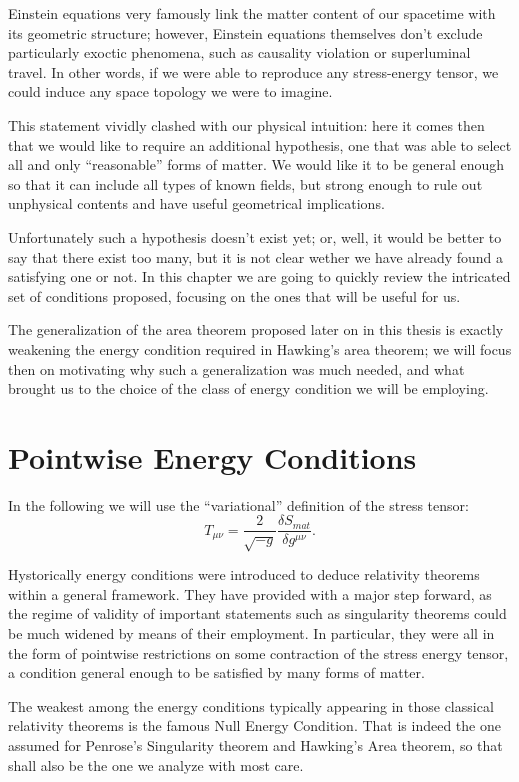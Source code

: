 Einstein equations very famously link the matter content of our spacetime with its geometric structure; however, Einstein equations themselves don't exclude particularly exoctic phenomena, such as causality violation or superluminal travel. In other words, if we were able to reproduce any stress-energy tensor, we could induce any space topology we were to imagine.

This statement vividly clashed with our physical intuition: here it comes then that we would like to require an additional hypothesis, one that was able to select all and only ``reasonable'' forms of matter. We would like it to be general enough so that it can include all types of known fields, but strong enough to rule out unphysical contents and have useful geometrical implications.

Unfortunately such a hypothesis doesn't exist yet; or, well, it would be better to say that there exist too many, but it is not clear wether we have already found a satisfying one or not. In this chapter we are going to quickly review the intricated set of conditions proposed, focusing on the ones that will be useful for us. 

The generalization of the area theorem proposed later on in this thesis is exactly weakening the energy condition required in Hawking's area theorem; we will focus then on motivating why such a generalization was much needed, and what brought us to the choice of the class of energy condition we will be employing.

\section{Pointwise Energy Conditions}

In the following we will use the ``variational'' definition of the stress tensor:
\[
   T_{\mu\nu} = \frac{2}{\sqrt{-g}} \frac{\delta S_{mat}}{\delta g^{\mu\nu}}. 
\]

Hystorically energy conditions were introduced to deduce relativity theorems within a general framework. They have provided with a major step forward, as the regime of validity of important statements such as singularity theorems could be much widened by means of their employment. 
In particular, they were all in the form of pointwise restrictions on some contraction of the stress energy tensor, a condition general enough to be satisfied by many forms of matter.

The weakest among the energy conditions typically appearing in those classical relativity theorems is the famous Null Energy Condition. That is indeed the one assumed for Penrose's Singularity theorem and Hawking's Area theorem, so that shall also be the one we analyze with most care.

